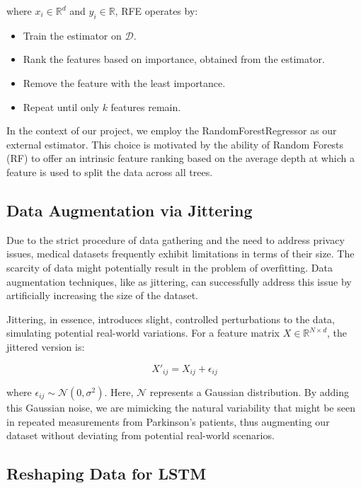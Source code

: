 where $x_i \in \mathbb{R}^d$ and $y_i \in \mathbb{R}$, RFE operates by:

\begin{itemize}
    \item Train the estimator on $\mathcal{D}$.
    \item Rank the features based on importance, obtained from the estimator.
    \item Remove the feature with the least importance.
    \item Repeat until only $k$ features remain.
\end{itemize}

In the context of our project, we employ the RandomForestRegressor as our external estimator. This choice is motivated by the ability of Random Forests (RF)\cite{7} to offer an intrinsic feature ranking based on the average depth at which a feature is used to split the data across all trees.

\subsection{Data Augmentation via Jittering}

Due to the strict procedure of data gathering and the need to address privacy issues, medical datasets frequently exhibit limitations in terms of their size. The scarcity of data might potentially result in the problem of overfitting. Data augmentation techniques, like as jittering\cite{9}, can successfully address this issue by artificially increasing the size of the dataset.

Jittering, in essence, introduces slight, controlled perturbations to the data, simulating potential real-world variations. For a feature matrix $X \in \mathbb{R}^{N \times d}$, the jittered version is:

\begin{equation}
    X'_{ij} = X_{ij} + \epsilon_{ij}
\end{equation}


where $\epsilon_{ij} \sim \mathcal{N}(0, \sigma^2)$. Here, $\mathcal{N}$ represents a Gaussian distribution. By adding this Gaussian noise, we are mimicking the natural variability that might be seen in repeated measurements from Parkinson's patients, thus augmenting our dataset without deviating from potential real-world scenarios.

\subsection{Reshaping Data for LSTM}

